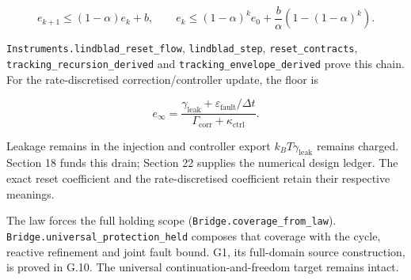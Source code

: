 \documentclass[
]{article}
\begin{document}
\[
e_{k+1}\le(1-\alpha)e_k+b,\qquad
e_k\le(1-\alpha)^ke_0+\frac b\alpha(1-(1-\alpha)^k).
\]

\texttt{I\allowbreak{}n\allowbreak{}s\allowbreak{}t\allowbreak{}r\allowbreak{}u\allowbreak{}m\allowbreak{}e\allowbreak{}n\allowbreak{}t\allowbreak{}s\allowbreak{}.\allowbreak{}l\allowbreak{}i\allowbreak{}n\allowbreak{}d\allowbreak{}b\allowbreak{}l\allowbreak{}a\allowbreak{}d\allowbreak{}\_\allowbreak{}r\allowbreak{}e\allowbreak{}s\allowbreak{}e\allowbreak{}t\allowbreak{}\_\allowbreak{}f\allowbreak{}l\allowbreak{}o\allowbreak{}w},
\texttt{lindblad\_step}, \texttt{reset\_contracts},
\texttt{t\allowbreak{}r\allowbreak{}a\allowbreak{}c\allowbreak{}k\allowbreak{}i\allowbreak{}n\allowbreak{}g\allowbreak{}\_\allowbreak{}r\allowbreak{}e\allowbreak{}c\allowbreak{}u\allowbreak{}r\allowbreak{}s\allowbreak{}i\allowbreak{}o\allowbreak{}n\allowbreak{}\_\allowbreak{}d\allowbreak{}e\allowbreak{}r\allowbreak{}i\allowbreak{}v\allowbreak{}e\allowbreak{}d}
and
\texttt{t\allowbreak{}r\allowbreak{}a\allowbreak{}c\allowbreak{}k\allowbreak{}i\allowbreak{}n\allowbreak{}g\allowbreak{}\_\allowbreak{}e\allowbreak{}n\allowbreak{}v\allowbreak{}e\allowbreak{}l\allowbreak{}o\allowbreak{}p\allowbreak{}e\allowbreak{}\_\allowbreak{}d\allowbreak{}e\allowbreak{}r\allowbreak{}i\allowbreak{}v\allowbreak{}e\allowbreak{}d}
prove this chain. For the rate-discretised
c\allowbreak{}o\allowbreak{}r\allowbreak{}r\allowbreak{}e\allowbreak{}c\allowbreak{}t\allowbreak{}i\allowbreak{}o\allowbreak{}n\allowbreak{}/\allowbreak{}c\allowbreak{}o\allowbreak{}n\allowbreak{}t\allowbreak{}r\allowbreak{}o\allowbreak{}l\allowbreak{}l\allowbreak{}e\allowbreak{}r
update, the floor is

\[
e_\infty=\frac{\gamma_{\mathrm{leak}}+\varepsilon_{\mathrm{fault}}/\Delta t}
{\Gamma_{\mathrm{corr}}+\kappa_{\mathrm{ctrl}}}.
\]

Leakage remains in the injection and controller export
\(k_BT\gamma_{\mathrm{leak}}\) remains charged. Section 18 funds this
drain; Section 22 supplies the numerical design ledger. The exact reset
coefficient and the rate-discretised coefficient retain their respective
meanings.

The law forces the full holding scope
(\texttt{B\allowbreak{}r\allowbreak{}i\allowbreak{}d\allowbreak{}g\allowbreak{}e\allowbreak{}.\allowbreak{}c\allowbreak{}o\allowbreak{}v\allowbreak{}e\allowbreak{}r\allowbreak{}a\allowbreak{}g\allowbreak{}e\allowbreak{}\_\allowbreak{}f\allowbreak{}r\allowbreak{}o\allowbreak{}m\allowbreak{}\_\allowbreak{}l\allowbreak{}a\allowbreak{}w}).
\texttt{B\allowbreak{}r\allowbreak{}i\allowbreak{}d\allowbreak{}g\allowbreak{}e\allowbreak{}.\allowbreak{}u\allowbreak{}n\allowbreak{}i\allowbreak{}v\allowbreak{}e\allowbreak{}r\allowbreak{}s\allowbreak{}a\allowbreak{}l\allowbreak{}\_\allowbreak{}p\allowbreak{}r\allowbreak{}o\allowbreak{}t\allowbreak{}e\allowbreak{}c\allowbreak{}t\allowbreak{}i\allowbreak{}o\allowbreak{}n\allowbreak{}\_\allowbreak{}h\allowbreak{}e\allowbreak{}l\allowbreak{}d}
composes that coverage with the cycle, reactive refinement and joint
fault bound. G1, its full-domain source construction, is proved in G.10.
The universal continuation-and-freedom target remains intact.
\end{document}
